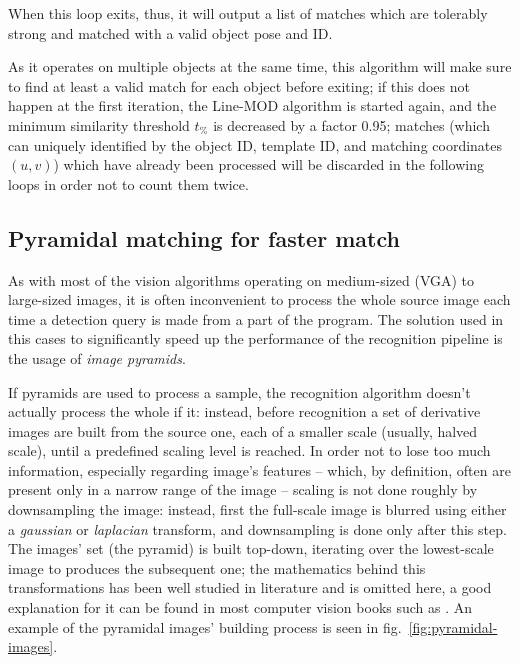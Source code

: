 When this loop exits, thus, it will output a list of matches which are
tolerably strong and matched with a valid object pose and ID.

As it operates on multiple objects at the same time, this algorithm
will make sure to find at least a valid match for each object before
exiting; if this does not happen at the first iteration, the
Line-MOD algorithm is started again, and the minimum similarity
threshold $t_\%$ is decreased by a factor 0.95; matches (which can
uniquely identified by the object ID, template ID, and matching
coordinates $(u,v)$) which have already been processed will be
discarded in the following loops in order not to count them twice.

\subsection{Pyramidal matching for faster match}
As with most of the vision algorithms operating on medium-sized (VGA)
to large-sized  images, it is often inconvenient to process the
whole source image each time a detection query is made from a part of
the program. The solution used in this cases to significantly speed up
the performance of the recognition pipeline is the usage of
\emph{image pyramids}.

If pyramids are used to process a sample, the recognition algorithm
doesn't actually process the whole if it: instead, before recognition
a set of derivative images are built from the source one, each of a
smaller scale (usually, halved scale), until a predefined scaling
level is reached. In order not to lose too much information,
especially regarding image's features -- which, by definition, often
are present only in a narrow range of the image -- scaling
is not done roughly by downsampling the image: instead, first the
full-scale image is blurred using either a \emph{gaussian} or
\emph{laplacian} transform, and downsampling is done only after this
step. The images' set (the pyramid) is built top-down, iterating over
the lowest-scale image to produces the subsequent one; the mathematics
behind this transformations has been well studied in literature and is
omitted here, a good explanation for it can be found in most computer
vision books such as \cite{computervision}. An example of the pyramidal
images' building process is seen in fig.~\ref{fig:pyramidal-images}.


